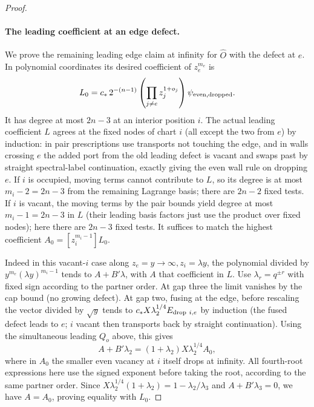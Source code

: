 \documentclass[11pt]{article}
\numberwithin{equation}{section}
\theoremstyle{definition}\newtheorem{definition}[theorem]{Definition}
\theoremstyle{remark}\newtheorem{remark}[theorem]{Remark}
\begin{document}
\begin{proof}
\paragraph{The leading coefficient at an edge defect.}
We prove the remaining leading edge claim at infinity for \(\widehat O\)
with the defect at \(e\). In polynomial coordinates its desired coefficient of \(z_e^{m_e}\) is
\[
 L_0= c_*\,2^{-(n-1)}\left(\prod_{j\ne e} z_j^{1+o_j}\right)
       \psi_{\rm even,dropped}.
\]
It has degree at most \(2n-3\) at an interior position \(i\). The actual leading coefficient \(L\) agrees at the fixed nodes of chart \(i\) (all except the two from \(e\)) by induction: in pair prescriptions use transports not touching the edge, and in walls crossing \(e\) the added port from the old leading defect is vacant and swaps past by straight spectral-label continuation, exactly giving the even wall rule on dropping \(e\). If \(i\) is occupied, moving terms cannot contribute to \(L\), so its degree is at most \(m_i-2=2n-3\) from the remaining Lagrange basis; there are \(2n-2\) fixed tests. If \(i\) is vacant, the moving terms by the pair bounds yield degree at most \(m_i-1=2n-3\) in \(L\) (their leading basis factors just use the product over fixed nodes); here there are \(2n-3\) fixed tests. It suffices to match the highest coefficient \(A_0=[z_i^{m_i-1}] L_0\).

Indeed in this vacant-\(i\) case along \(z_e=y\to\infty,z_i=\lambda y\), the polynomial divided by \(y^{m_e}(\lambda y)^{m_i-1}\) tends to \(A+B'\lambda\), with \(A\) that coefficient in \(L\). Use \(\lambda_r=q^{\pm r}\) with fixed sign according to the partner order. At gap three the limit vanishes by the cap bound (no growing defect). At gap two, fusing at the edge, before rescaling the vector divided by \(\sqrt y\) tends to \(c_* X\lambda_2^{1/4} E_{{\rm drop}\ i,e}\) by induction (the fused defect leads to \(e\); \(i\) vacant then transports back by straight continuation). Using the simultaneous leading \(Q_o\) above, this gives
\[
 A+B'\lambda_2=(1+\lambda_2) X\lambda_2^{1/4} A_0 ,
\]
where in \(A_0\) the smaller even vacancy at \(i\) itself drops at infinity. All fourth-root expressions here use the signed exponent before taking the root, according to the same partner order. Since \(X\lambda_2^{1/4}(1+\lambda_2)=1-\lambda_2/\lambda_3\) and \(A+B'\lambda_3=0\), we have \(A=A_0\), proving equality with \(L_0\).


\end{proof}
\end{document}
